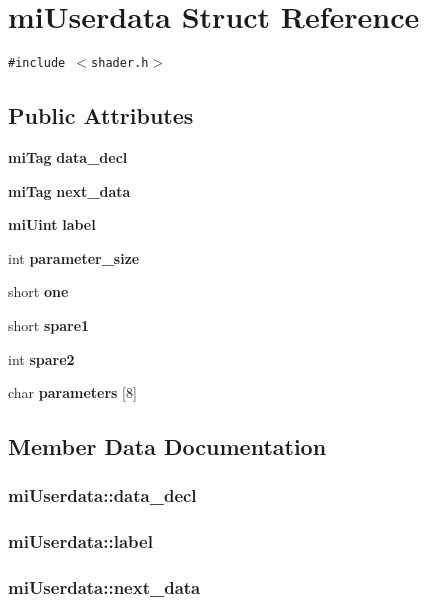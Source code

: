 \section{mi\-Userdata Struct Reference}
\label{structmiUserdata}
{\tt \#include $<$shader.h$>$}

\subsection*{Public Attributes}
\begin{CompactItemize}
\item 
{\bf mi\-Tag} {\bf data\_\-decl}
\item 
{\bf mi\-Tag} {\bf next\_\-data}
\item 
{\bf mi\-Uint} {\bf label}
\item 
int {\bf parameter\_\-size}
\item 
short {\bf one}
\item 
short {\bf spare1}
\item 
int {\bf spare2}
\item 
char {\bf parameters} [8]
\end{CompactItemize}


\subsection{Member Data Documentation}
\subsubsection{ {\bf mi\-Userdata::data\_\-decl}}\label{structmiUserdata_o0}


\subsubsection{ {\bf mi\-Userdata::label}}\label{structmiUserdata_o2}


\subsubsection{ {\bf mi\-Userdata::next\_\-data}}\label{structmiUserdata_o1}



